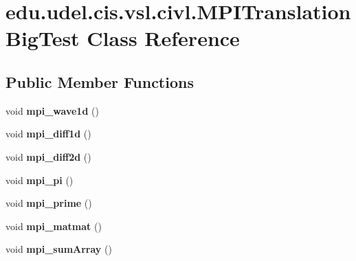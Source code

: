 \hypertarget{classedu_1_1udel_1_1cis_1_1vsl_1_1civl_1_1MPITranslationBigTest}{}\section{edu.\+udel.\+cis.\+vsl.\+civl.\+M\+P\+I\+Translation\+Big\+Test Class Reference}
\label{classedu_1_1udel_1_1cis_1_1vsl_1_1civl_1_1MPITranslationBigTest}
\subsection*{Public Member Functions}
\begin{DoxyCompactItemize}
\item 
\hypertarget{classedu_1_1udel_1_1cis_1_1vsl_1_1civl_1_1MPITranslationBigTest_aa82ceaa13105ef4690e3692472445ee9}{}void {\bfseries mpi\+\_\+wave1d} ()\label{classedu_1_1udel_1_1cis_1_1vsl_1_1civl_1_1MPITranslationBigTest_aa82ceaa13105ef4690e3692472445ee9}

\item 
\hypertarget{classedu_1_1udel_1_1cis_1_1vsl_1_1civl_1_1MPITranslationBigTest_ae5c0bebe0f598238518e1dbb52c7add2}{}void {\bfseries mpi\+\_\+diff1d} ()\label{classedu_1_1udel_1_1cis_1_1vsl_1_1civl_1_1MPITranslationBigTest_ae5c0bebe0f598238518e1dbb52c7add2}

\item 
\hypertarget{classedu_1_1udel_1_1cis_1_1vsl_1_1civl_1_1MPITranslationBigTest_a01bb98ce03f1aa9dfeb05d0e9b796e54}{}void {\bfseries mpi\+\_\+diff2d} ()\label{classedu_1_1udel_1_1cis_1_1vsl_1_1civl_1_1MPITranslationBigTest_a01bb98ce03f1aa9dfeb05d0e9b796e54}

\item 
\hypertarget{classedu_1_1udel_1_1cis_1_1vsl_1_1civl_1_1MPITranslationBigTest_a54c6fbdbdad9ac5f70b09099d5e3ea37}{}void {\bfseries mpi\+\_\+pi} ()\label{classedu_1_1udel_1_1cis_1_1vsl_1_1civl_1_1MPITranslationBigTest_a54c6fbdbdad9ac5f70b09099d5e3ea37}

\item 
\hypertarget{classedu_1_1udel_1_1cis_1_1vsl_1_1civl_1_1MPITranslationBigTest_abb94084bce41f0169b16442500fbbbeb}{}void {\bfseries mpi\+\_\+prime} ()\label{classedu_1_1udel_1_1cis_1_1vsl_1_1civl_1_1MPITranslationBigTest_abb94084bce41f0169b16442500fbbbeb}

\item 
\hypertarget{classedu_1_1udel_1_1cis_1_1vsl_1_1civl_1_1MPITranslationBigTest_a5702b0741c53338a8703b6e87357c5ee}{}void {\bfseries mpi\+\_\+matmat} ()\label{classedu_1_1udel_1_1cis_1_1vsl_1_1civl_1_1MPITranslationBigTest_a5702b0741c53338a8703b6e87357c5ee}

\item 
\hypertarget{classedu_1_1udel_1_1cis_1_1vsl_1_1civl_1_1MPITranslationBigTest_a6a9593abb685321c475b896913d40a39}{}void {\bfseries mpi\+\_\+sum\+Array} ()\label{classedu_1_1udel_1_1cis_1_1vsl_1_1civl_1_1MPITranslationBigTest_a6a9593abb685321c475b896913d40a39}

\end{DoxyCompactItemize}
